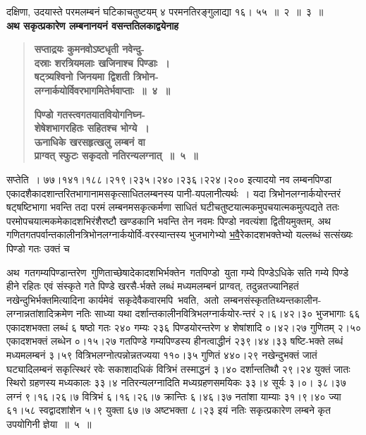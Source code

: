 \documentclass[11pt, openany]{book}
\begin{document}
\newpage

\noindent दक्षिणा, उदयास्ते परमलम्बनं घटिकाचतुष्टयम् ४ परमनतिरङ्गुलाद्या १६। ५५~॥~२~॥~३~॥ \\

{\small \textbf{अथ सकृत्प्रकारेण लम्बनानयनं वसन्ततिलकाद्वयेनाह\textendash }}

 \label{5.4}
\begin{quote}
{\large \textbf{{\color{purple}सप्ताद्रयः कुमनवोऽष्टधृती नवेन्दु-\\
दस्राः शरत्रियमलाः खजिनाश्च पिण्डाः~। \\
षट्त्र्यश्विनो जिनयमा द्विशती त्रिभोन-\\
लग्नार्कयोर्विवरभागमितेर्भवाप्ताः~॥~४~॥}}
\vspace{1mm}

 \label{5.5}
\textbf{{\color{purple}पिण्डो गतस्त्वगतयातवियोगनिघ्न-\\
शेषेशभागरहितः सहितश्च भोग्ये~। \\
ऊनाधिके खरसहृत्खलु लम्बनं वा \\
प्राग्वत् स्फुटः सकृदतो नतिरन्यलग्नात्~॥~५~॥}}}
\end{quote}

सप्तेति~। ७७।१४१।१८८।२१९।२३५।२४०।२३६।२२४।२०० इत्यादयो नव लम्बनपिण्डा एकादशैकादशान्तरितभागानामसकृत्साधितलम्बनस्य पानी-यपलानीत्यर्थः~। यदा त्रिभोनलग्नार्कयोरन्तरं षट्षष्टिभागा भवन्ति तदा परमं लम्बनमसकृत्कर्मणा \;साधितं \;घटीचतुष्टयात्मकमुपचयात्मकमुत्पद्यते \;ततः परमोपचयात्मकमेकादशभिरंशैरष्टौ खण्डकानि भवन्ति तेन नवमः पिण्डो नवत्यंशा द्वितीयमुक्तम्, अथ गणितगतपर्वान्तकालीनत्रिभोनलग्नार्कयोर्वि-वरस्यान्तस्य भुजभागेभ्यो \hyperref[5.4]{भवै}रेकादशभक्तेभ्यो यल्लब्धं सत्संख्यः पिण्डो गतः उक्तं \;च 

\newpage

\noindent अथ \,गतगम्यपिण्डान्तरेण \,गुणिताच्छेषादेकादशभिर्भक्तेन \,गतपिण्डो \,युता गम्ये पिण्डेऽधिके सति गम्ये पिण्डे हीने रहितः एवं संस्कृते गते पिण्डे खरसै-र्भक्ते लब्धं मध्यमलम्बनं प्राग्वत्, तदुन्नतज्यानिहतं नखेन्दुभिर्भक्तमित्यादिना कार्यमेवं \,सकृदेवैकवारमपि \,भवति, \,अतो \,लम्बनसंस्कृततिथ्यन्तकालीन-लग्नान्नतांशादिक्रमेण नतिः साध्या यथा दर्शान्तकालीनवित्रिभलग्नार्कयोर-न्तरं २।६।४२।३० भुजभागाः ६६ एकादशभक्ता लब्धं ६ षष्ठो गतः २४० गम्यः २३६ पिण्डयोरन्तरेण ४ शेषांशादि ०।४२।२७ गुणितम् २।५० एकादशभक्तं लब्धेन ०।१५।२७ गतपिण्डे गम्यपिण्डस्य हीनत्वाद्धीनं २३९।४४।३३ षष्टि-भक्ते लब्धं मध्यमलम्बनं ३।५९ वित्रिभलग्नोत्पन्नोन्नतज्यया ११०।३५ गुणितं ४४०।२९ नखेन्दुभक्तं जातं घट्यादिलम्बनं सकृत्स्थिरं रवेः सकाशादधिकं वित्रिभं तस्माद्धनं ३।४० दर्शान्ततिथौ २९।२४ युक्तं जातः स्थिरो ग्रहणस्य मध्यकालः ३३।४ नतिरन्यलग्नादिति मध्यग्रहणसमयिकः ३३।४ सूर्यः ३।०। ३८।३७ लग्नं ९।१६।२६।७ वित्रिभं ६।१६।२६।७ क्रान्तिः ६।४६।३७ नतांशा याम्याः ३१।९।४० ज्या ६१।५८ स्वद्वादशांशेन ५।९ युक्ता ६७।७ अष्टभक्ता ८।२३ इयं नतिः सकृत्प्रकारेण लम्बने कृत उपयोगिनी ज्ञेया~॥~५~॥
\end{document}
